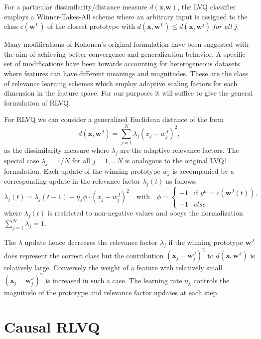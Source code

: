 \documentclass{esannV2}
\begin{document}
For a particular dissimilarity/distance measure $d(\textbf{x,w})$, the LVQ classifier employs a Winner-Takes-All scheme where an arbitrary input is assigned to the class $c(\textbf{w}^L)$ of the closest prototype with $d(\textbf{x},\textbf{w}^L) \leq d(\textbf{x},\textbf{w}^j)$ \textsl{for all} $j$.

Many modifications of Kohonen's original formulation \cite{02} have been suggested with the aim of achieving better convergence and generalization behavior. A specific set of modifications have been towards accounting for heterogeneous datasets where features can have different meanings and magnitudes. These are the class of relevance learning schemes which employ adaptive scaling factors for each dimension in the feature space. For our purposes it will suffice to give the general formulation of RLVQ.

For RLVQ we can consider a generalized Euclidean distance of the form
%
\begin{equation} 
d(\textbf{x},\textbf{w}^J) = \sum^N_{j=1} \lambda_j (x_j - w^J_j)^2 ,
\end{equation}
%
\noindent
as the dissimilarity measure where $\lambda_j$ are the adaptive relevance factors. The special case $\lambda_j = 1/N$ for all $j = 1,\ldots N$ is analogous to the original LVQ1 formulation. Each update of the winning prototype $w_j$ is accompanied by a corresponding update in the relevance factor $\lambda_j(t)$ as follows;
%
\begin{equation}
\lambda_j(t) = \lambda_j(t-1) - \eta_\lambda \phi \cdot (x_j - w^J_j)^2  \quad \text{with} \quad
\phi = \begin{cases}
+1& \text{if $y^\mu = c(\textbf{w}^J(t))$},\\
-1& else 
\end{cases}
\end{equation}
%
where $\lambda_j(t)$ is restricted to non-negative values and obeys the normalization $\sum^N_{j=1} \lambda_j = 1$.

The $\lambda$ update hence decreases the relevance factor $\lambda_j$ if the winning prototype $\textbf{w}^J$ does represent the correct class but the contribution $(\textbf{x}_j - \textbf{w}^J_j)^2$ to $d(\textbf{x},\textbf{w}^J)$ is relatively large. Conversely the weight of a feature with relatively small $(\textbf{x}_j - \textbf{w}^J_j)^2$ is increased in such a case. The learning rate $\eta_\lambda$ controls the magnitude of the prototype and relevance factor updates at each step.

\section{Causal RLVQ}
\label{sec:CRLVQ}
\end{document}
